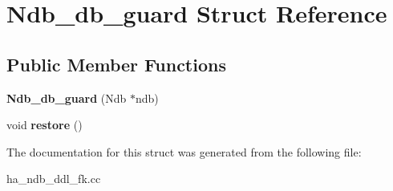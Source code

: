 \hypertarget{structNdb__db__guard}{}\section{Ndb\+\_\+db\+\_\+guard Struct Reference}
\label{structNdb__db__guard}
\subsection*{Public Member Functions}
\begin{DoxyCompactItemize}
\item 
\mbox{\label{structNdb__db__guard_a721223bb204c9c9f7ca02c15665f57e2}} 
{\bfseries Ndb\+\_\+db\+\_\+guard} (Ndb $\ast$ndb)
\item 
\mbox{\label{structNdb__db__guard_a5b58a7312a29a38a9ad715024d85e18c}} 
void {\bfseries restore} ()
\end{DoxyCompactItemize}


The documentation for this struct was generated from the following file\+:\begin{DoxyCompactItemize}
\item 
ha\+\_\+ndb\+\_\+ddl\+\_\+fk.\+cc\end{DoxyCompactItemize}
